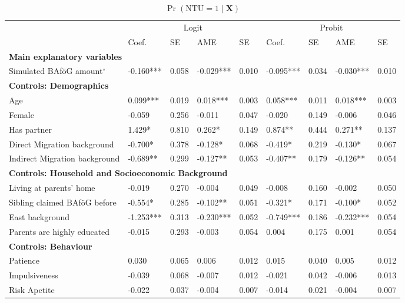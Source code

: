 \begin{table}
\caption{$\Pr(\mathrm{NTU} = 1 \mid \mathbf{X})$}
\renewcommand{\arraystretch}{1.25}
\footnotesize
\centering
\begin{tabular}{lllllllll}
\toprule
 & \multicolumn{4}{c}{Logit} & \multicolumn{4}{c}{Probit} \\
\cmidrule(lr){2-5} \cmidrule(lr){6-9}
 & Coef. & SE & AME & SE & Coef. & SE & AME & SE \\
\midrule
\multicolumn{9}{l}{\textbf{Main explanatory variables}} \\
Simulated BAföG amount$^{\circ}$ & -0.160*** & 0.058 & -0.029*** & 0.010 & -0.095*** & 0.034 & -0.030*** & 0.010 \\
\midrule
\multicolumn{9}{l}{\textbf{Controls: Demographics}} \\
Age & 0.099*** & 0.019 & 0.018*** & 0.003 & 0.058*** & 0.011 & 0.018*** & 0.003 \\
Female & -0.059 & 0.256 & -0.011 & 0.047 & -0.020 & 0.149 & -0.006 & 0.046 \\
Has partner & 1.429* & 0.810 & 0.262* & 0.149 & 0.874** & 0.444 & 0.271** & 0.137 \\
Direct Migration background & -0.700* & 0.378 & -0.128* & 0.068 & -0.419* & 0.219 & -0.130* & 0.067 \\
Indirect Migration background & -0.689** & 0.299 & -0.127** & 0.053 & -0.407** & 0.179 & -0.126** & 0.054 \\
\midrule
\multicolumn{9}{l}{\textbf{Controls: Household and Socioeconomic Background}} \\
Living at parents’ home & -0.019 & 0.270 & -0.004 & 0.049 & -0.008 & 0.160 & -0.002 & 0.050 \\
Sibling claimed BAföG before & -0.554* & 0.285 & -0.102** & 0.051 & -0.321* & 0.171 & -0.100* & 0.052 \\
East background & -1.253*** & 0.313 & -0.230*** & 0.052 & -0.749*** & 0.186 & -0.232*** & 0.054 \\
Parents are highly educated & -0.015 & 0.293 & -0.003 & 0.054 & 0.004 & 0.175 & 0.001 & 0.054 \\
\midrule
\multicolumn{9}{l}{\textbf{Controls: Behaviour}} \\
Patience & 0.030 & 0.065 & 0.006 & 0.012 & 0.015 & 0.040 & 0.005 & 0.012 \\
Impulsiveness & -0.039 & 0.068 & -0.007 & 0.012 & -0.021 & 0.042 & -0.006 & 0.013 \\
Risk Apetite & -0.022 & 0.037 & -0.004 & 0.007 & -0.014 & 0.021 & -0.004 & 0.007 \\

\end{tabular}
\end{table}

